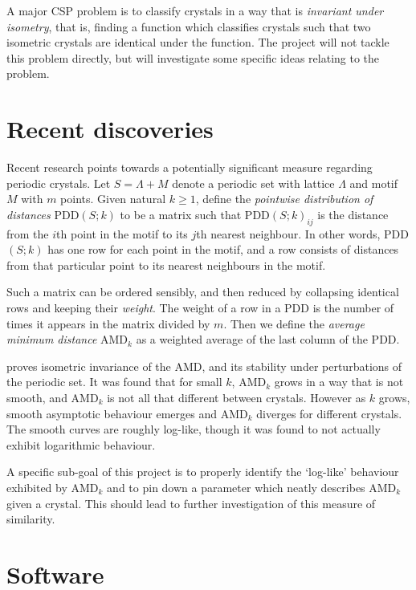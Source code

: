 \documentclass[12pt]{article}
\begin{document}
 A major CSP problem is to classify crystals in a way that is \emph{invariant under isometry}, that is, finding a function which classifies crystals such that two isometric crystals are identical under the function. The project will not tackle this problem directly, but will investigate some specific ideas relating to the problem.

\section{Recent discoveries}

Recent research \cite{MoscaKurlin} points towards a potentially significant measure regarding periodic crystals. Let $S = \Lambda + M$ denote a periodic set with lattice $\Lambda$ and motif $M$ with $m$ points. Given natural $k\geq 1$, define the \emph{pointwise distribution of distances} PDD$(S;k)$ to be a matrix such that PDD$(S;k)_{ij}$ is the distance from the $i$th point in the motif to its $j$th nearest neighbour. In other words, PDD$(S;k)$ has one row for each point in the motif, and a row consists of distances from that particular point to its nearest neighbours in the motif. 

Such a matrix can be ordered sensibly, and then reduced by collapsing identical rows and keeping their \emph{weight}. The weight of a row in a PDD is the number of times it appears in the matrix divided by $m$. Then we define the \emph{average minimum distance} AMD$_k$ as a weighted average of the last column of the PDD. 

\cite{MoscaKurlin} proves isometric invariance of the AMD, and its stability under perturbations of the periodic set. It was found that for small $k$, AMD$_k$ grows in a way that is not smooth, and AMD$_k$ is not all that different between crystals. However as $k$ grows, smooth asymptotic behaviour emerges and AMD$_k$ diverges for different crystals. The smooth curves are roughly log-like, though it was found to not actually exhibit logarithmic behaviour. 

A specific sub-goal of this project is to properly identify the `log-like' behaviour exhibited by AMD$_k$ and to pin down a parameter which neatly describes AMD$_k$ given a crystal. This should lead to further investigation of this measure of similarity.

\section{Software}
\end{document}
